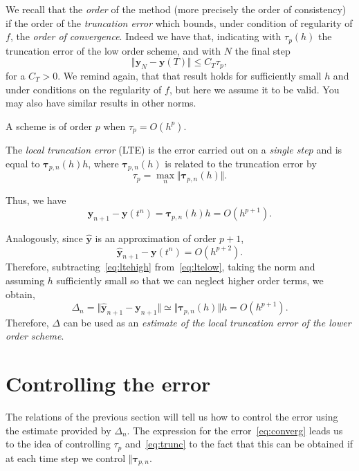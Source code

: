 \documentclass[10pt,a4paper,twoside]{article}
\begin{document}
We recall that the \emph{order} of the method (more precisely the order of consistency) if the order of the \emph{truncation error} which bounds, under condition of regularity of $f$, the \emph{order of convergence}. Indeed we have that, indicating with $\tau_p(h)$ the truncation error of the low order scheme, and with $N$ the final step
\begin{equation}\label{eq:converg}
\Vert \mathbf{y}_{N}-\mathbf{y}(T)\Vert \le C_T \tau_p,
\end{equation}
for a $C_T>0$.
We remind again, that that result holds for sufficiently small $h$ and under conditions on the regularity of $f$, but here we assume it to be valid. You may also have similar results in other norms.

A scheme is of order $p$ when $\tau_p=O(h^p)$.

The \emph{local truncation error} (LTE) is the error carried out on a \emph{single step} and is equal to $\boldsymbol{\tau}_{p,n}(h) h$, where $\boldsymbol{\tau}_{p,n}(h)$ is related to the truncation error by 
\begin{equation}\label{eq:trunc}
\tau_p=\max_n \Vert\boldsymbol{\tau}_{p,n}(h)\Vert.
\end{equation}

Thus, we have 
\begin{equation}\label{eq:ltelow}
\mathbf{y}_{n+1}-\mathbf{y}(t^n) = \boldsymbol\tau_{p,n}(h) h =O(h^{p+1}).
\end{equation}

Analogously, since $\hat{\mathbf{y}}$ is an approximation of order $p+1$,
\begin{equation}\label{eq:ltehigh}
\hat{\mathbf{y}}_{n+1}-\mathbf{y}(t^n) =O(h^{p+2}).
\end{equation}
Therefore, subtracting~\eqref{eq:ltehigh} from~\eqref{eq:ltelow}, taking the norm and assuming $h$ sufficiently small so that we can neglect higher order terms, we obtain,
\begin{equation}\label{eq:delta}
\Delta_n=\Vert \hat{\mathbf{y}}_{n+1}-\mathbf{y}_{n+1} \Vert\simeq \Vert \boldsymbol\tau_{p,n}(h)\Vert  h= O(h^{p+1}).
\end{equation}
Therefore, $\Delta$ can be used as an \emph{estimate of the local truncation error of the lower order scheme}.
\section{Controlling the error}
The relations of the previous section will tell us how to control the error using the estimate provided by $\Delta_n$. The expression for the error~\eqref{eq:converg}
 leads us to the idea of controlling $\tau_p$ and~\eqref{eq:trunc} to the fact that this can be obtained if at each time step we control $\Vert\boldsymbol{\tau}_{p,n}$.
 
\end{document}
